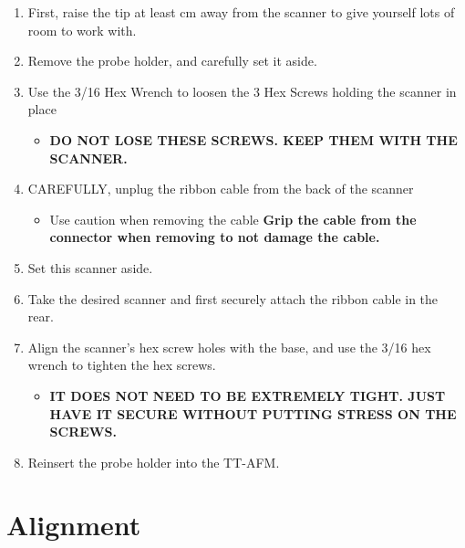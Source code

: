 \documentclass{../lab}
\begin{document}
\begin{enumerate}
    \item First, raise the tip at least cm away from the scanner to give yourself lots of room to work with.

    \item Remove the probe holder, and carefully set it aside.

    \item Use the 3/16 Hex Wrench to loosen the 3 Hex Screws holding the scanner in place

    \begin{itemize}
        \item \textbf{DO NOT LOSE THESE SCREWS. KEEP THEM WITH THE SCANNER.}
    \end{itemize}

    \item CAREFULLY, unplug the ribbon cable from the back of the scanner

    \begin{itemize}
        \item Use caution when removing the cable \textbf{Grip the cable from the connector when removing to not damage the cable.}
    \end{itemize}

    \item Set this scanner aside.

    \item Take the desired scanner and first securely attach the ribbon cable in the rear.

    \item Align the scanner's hex screw holes with the base, and use the 3/16 hex wrench to tighten the hex screws.

    \begin{itemize}
        \item \textbf{IT DOES NOT NEED TO BE EXTREMELY TIGHT. JUST HAVE IT SECURE WITHOUT PUTTING STRESS ON THE SCREWS.}
    \end{itemize}

    \item Reinsert the probe holder into the TT-AFM.

\end{enumerate}

\section{Alignment}
\label{sec:Alignment}
\end{document}
